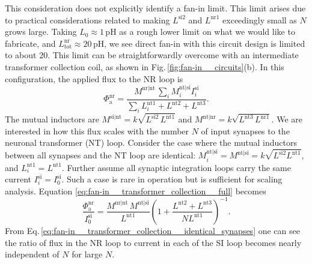 \documentclass[twocolumn]{article}
\begin{document}
This consideration does not explicitly identify a fan-in limit. This limit arises due to practical considerations related to making $L^{\mathrm{si2}}$ and $L^{\mathrm{nr1}}$ exceedingly small as $N$ grows large. Taking $L_0 \approx 1$\,pH as a rough lower limit on what we would like to fabricate, and $L_{\mathrm{tot}}^{\mathrm{nr}} \approx 20$\,pH, we see direct fan-in with this circuit design is limited to about 20. This limit can be straightforwardly overcome with an intermediate transformer collection coil, as shown in Fig.\,\ref{fig:fan-in__circuits}(b). In this configuration, the applied flux to the NR loop is
\begin{equation}
\label{eq:fan-in__transformer_collection__full}
\Phi_{\mathrm{a}}^{\mathrm{nr}} = \frac{ M^{\mathrm{nr|nt}} \, \sum_i M^{\mathrm{nt|si}}_i I_i^{\mathrm{si}} }{ \sum_i L^{\mathrm{nt1}}_i + L^{\mathrm{nt2}} + L^{\mathrm{nt3}} }.
\end{equation}
The mutual inductors are $M^{\mathrm{si|nt}} = k\sqrt{L^{\mathrm{si2}} \, L^{\mathrm{nt1}}}$ and $M^{\mathrm{nt|nr}} = k\sqrt{L^{\mathrm{nt3}} \, L^{\mathrm{nr1}}}$. We are interested in how this flux scales with the number $N$ of input synapses to the neuronal transformer (NT) loop. Consider the case where the mutual inductors between all synapses and the NT loop are identical: $M^{\mathrm{nt|si}}_i = M^{\mathrm{nt|si}} = k \sqrt{L^{\mathrm{si2}}L^{\mathrm{nt1}}}$, and $L^{\mathrm{nt1}}_i = L^{\mathrm{nt1}}$. Further assume all synaptic integration loops carry the same current $I^{\mathrm{si}}_i = I^{\mathrm{si}}_0$. Such a case is rare in operation but is sufficient for scaling analysis. Equation \ref{eq:fan-in__transformer_collection__full} becomes
\begin{equation}
\label{eq:fan-in__transformer_collection__identical_synapses}
\frac{ \Phi_{\mathrm{a}}^{\mathrm{nr}} }{ I^{\mathrm{si}}_0 } = \frac{ M^{\mathrm{nr|nt}} \, M^{\mathrm{nt|si}} }{ L^{\mathrm{nt1}} } \left( 1 + \frac{ L^{\mathrm{nt2}} + L^{\mathrm{nt3}} } { N L^{\mathrm{nt1}} } \right)^{-1}.
\end{equation}
From Eq.\,\ref{eq:fan-in__transformer_collection__identical_synapses} one can see the ratio of flux in the NR loop to current in each of the SI loop becomes nearly independent of $N$ for large $N$. 
\end{document}
